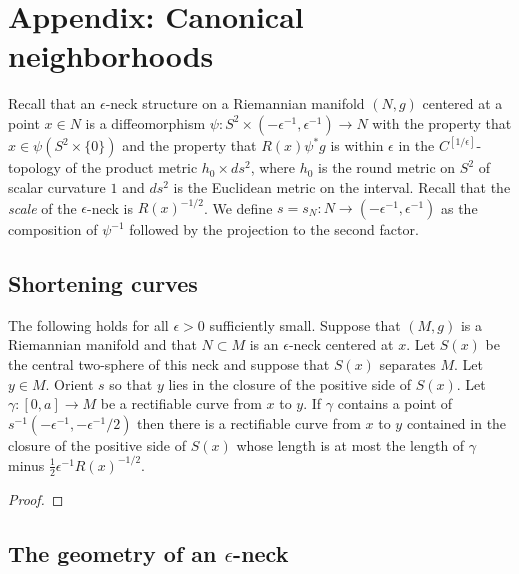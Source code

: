 \chapter{Appendix: Canonical neighborhoods}
\label{chap:canonical-neighborhoods}
\label{sect:canonnbhd}


Recall that an $\epsilon$-neck structure on a Riemannian manifold
$(N,g)$ centered at a point $x\in N$ is a diffeomorphism $\psi\colon
S^2\times (-\epsilon^{-1},\epsilon^{-1})\to N$ with the property
that $x\in \psi(S^2\times\{0\})$ and the property that $R(x)\psi^*g$
is within $\epsilon$ in the $C^{[1/\epsilon]}$-topology of the
product metric $h_0\times ds^2$, where $h_0$ is the round metric on
$S^2$ of scalar curvature $1$ and $ds^2$ is the Euclidean metric on
the interval. Recall that the {\em scale} of the $\epsilon$-neck is
$R(x)^{-1/2}$. We define $s=s_N\colon N\to
(-\epsilon^{-1},\epsilon^{-1})$ as the composition of $\psi^{-1}$
followed by the projection to the second factor.


\section{Shortening curves}

\begin{lemma}
\label{lem:neck-shortening-curve}
\label{curveshort}
The following holds for all $\epsilon>0$ sufficiently small. Suppose
that $(M,g)$ is a Riemannian manifold and that $N\subset M$ is an
$\epsilon$-neck centered at $x$. Let $S(x)$ be the central
two-sphere of this neck and suppose that $S(x)$ separates $M$. Let
$y\in M$. Orient $s$ so that $y$ lies in the closure of the positive
side of $S(x)$. Let $\gamma\colon [0,a]\to M$ be a rectifiable curve
from $x$ to $y$. If $\gamma$ contains a point of
$s^{-1}(-\epsilon^{-1},-\epsilon^{-1}/2)$ then there is a
rectifiable curve from $x$ to $y$ contained in the closure of the
positive side of $S(x)$ whose length is at most the length of
$\gamma$ minus $\frac{1}{2}\epsilon^{-1}R(x)^{-1/2}$.
\end{lemma}


\begin{proof}
\sketch
{}
\end{proof}



\section{The geometry of an $\epsilon$-neck}


